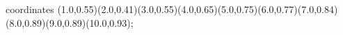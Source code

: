 					coordinates { (1.0,0.55)(2.0,0.41)(3.0,0.55)(4.0,0.65)(5.0,0.75)(6.0,0.77)(7.0,0.84)(8.0,0.89)(9.0,0.89)(10.0,0.93)};